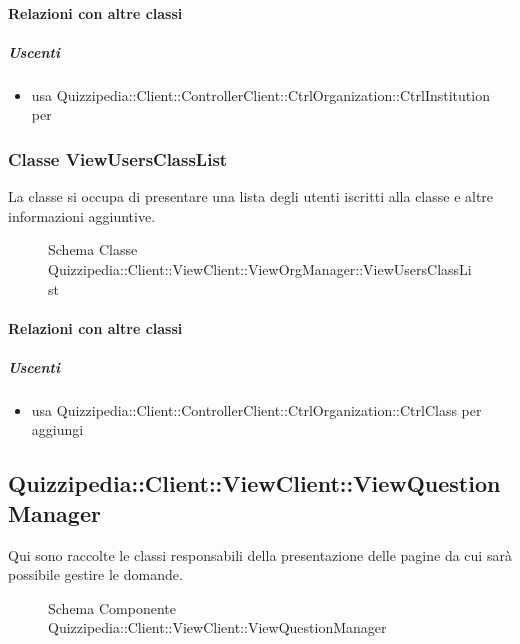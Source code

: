 \paragraph{Relazioni con altre classi}
\subparagraph{Uscenti}
\begin{itemize}
\item usa Quizzipedia::Client::ControllerClient::CtrlOrganization::CtrlInstitution per 
\end{itemize}
\subsubsection{Classe ViewUsersClassList}
La classe si occupa di presentare una lista degli utenti iscritti alla classe e altre informazioni aggiuntive.
\begin{figure}[H]
\centering
\noindent{}
\caption[Schema Classe ViewUsersClassList]{Schema Classe Quizzipedia::Client::ViewClient::ViewOrgManager::ViewUsersClassList}
\end{figure}
\paragraph{Relazioni con altre classi}
\subparagraph{Uscenti}
\begin{itemize}
\item usa Quizzipedia::Client::ControllerClient::CtrlOrganization::CtrlClass per aggiungi
\end{itemize}
\subsection{Quizzipedia::Client::ViewClient::ViewQuestionManager}
Qui sono raccolte le classi responsabili della presentazione delle pagine da cui sarà possibile gestire le domande.
\begin{figure}[H]
\centering
\noindent{}
\caption[Schema Componente Quizzipedia::Client::ViewClient::ViewQuestionManager]{Schema Componente Quizzipedia::Client::ViewClient::ViewQuestionManager}
\end{figure}
